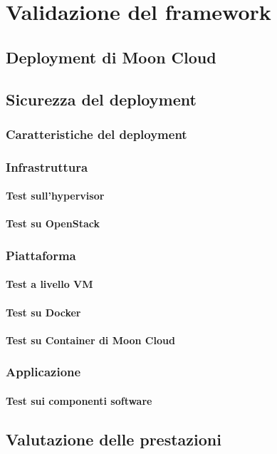 \documentclass[../main.tex]{subfiles}
\begin{document}
\chapter{Validazione del framework}
\section{Deployment di Moon Cloud}
\section{Sicurezza del deployment}
\subsection{Caratteristiche del deployment}

\subsection{Infrastruttura}
\subsubsection{Test sull'hypervisor}
\subsubsection{Test su OpenStack}

\subsection{Piattaforma}
\subsubsection{Test a livello VM}
\subsubsection{Test su Docker}
\subsubsection{Test su Container di Moon Cloud}

\subsection{Applicazione}
\subsubsection{Test sui componenti software}

\section{Valutazione delle prestazioni}
\end{document}
